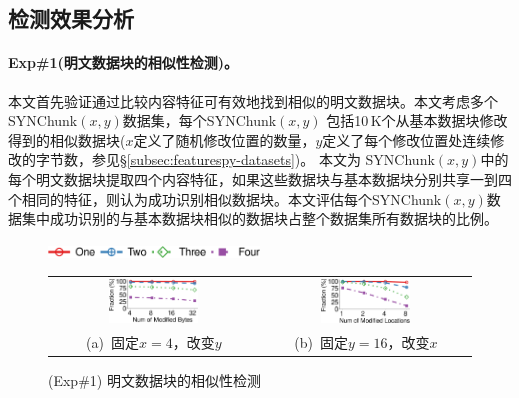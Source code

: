 \subsection{检测效果分析}
\label{subsec:featurespy-evaluation-detection}

\paragraph*{Exp\#1(明文数据块的相似性检测)。}本文首先验证通过比较内容特征可有效地找到相似的明文数据块。本文考虑多个SYNChunk$(x, y)$数据集，每个SYNChunk$(x, y)$ 包括10\,K个从基本数据块修改得到的相似数据块($x$定义了随机修改位置的数量，$y$定义了每个修改位置处连续修改的字节数，参见\S\ref{subsec:featurespy-datasets})。 本文为 SYNChunk$(x, y)$中的每个明文数据块提取四个内容特征，如果这些数据块与基本数据块分别共享一到四个相同的特征，则认为成功识别相似数据块。本文评估每个SYNChunk$(x, y)$数据集中成功识别的与基本数据块相似的数据块占整个数据集所有数据块的比例。

\begin{figure}[!htb]
    \centering
    \includegraphics[width=0.5\textwidth]{pic/featurespy/plot/detection/syn/fixed_pq_legend.pdf}
    \vspace{5pt}\\
    \begin{tabular}{@{\ }c@{\ }c}
        \includegraphics[width=0.45\textwidth]{pic/featurespy/plot/detection/syn/fixed_p_4.pdf} &
        \includegraphics[width=0.45\textwidth]{pic/featurespy/plot/detection/syn/fixed_q_16.pdf}  \\
        \mbox{\small (a) 固定$x=4$，改变$y$}                                                    &
        \mbox{\small (b) 固定$y=16$，改变$x$}                                                     \\
    \end{tabular}
    \caption{(Exp\#1) 明文数据块的相似性检测}
    \label{fig:featurespy-expDetectionSynSim}
\end{figure}

